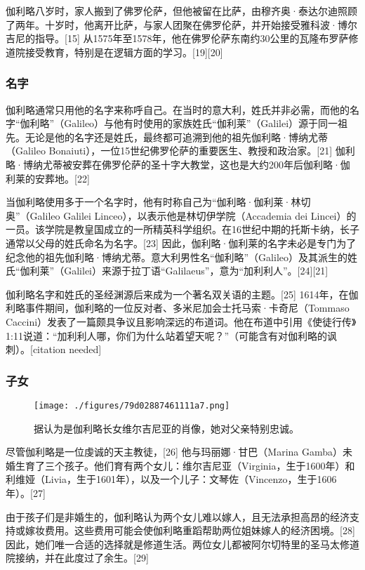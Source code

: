伽利略八岁时，家人搬到了佛罗伦萨，但他被留在比萨，由穆齐奥·泰达尔迪照顾了两年。十岁时，他离开比萨，与家人团聚在佛罗伦萨，并开始接受雅科波·博尔吉尼的指导。[15] 从1575年至1578年，他在佛罗伦萨东南约30公里的瓦隆布罗萨修道院接受教育，特别是在逻辑方面的学习。[19][20]
\subsubsection{名字}  
伽利略通常只用他的名字来称呼自己。在当时的意大利，姓氏并非必需，而他的名字“伽利略”（Galileo）与他有时使用的家族姓氏“伽利莱”（Galilei）源于同一祖先。无论是他的名字还是姓氏，最终都可追溯到他的祖先伽利略·博纳尤蒂（Galileo Bonaiuti），一位15世纪佛罗伦萨的重要医生、教授和政治家。[21] 伽利略·博纳尤蒂被安葬在佛罗伦萨的圣十字大教堂，这也是大约200年后伽利略·伽利莱的安葬地。[22]  

当伽利略使用多于一个名字时，他有时称自己为“伽利略·伽利莱·林切奥”（Galileo Galilei Linceo），以表示他是林切伊学院（Accademia dei Lincei）的一员。该学院是教皇国成立的一所精英科学组织。在16世纪中期的托斯卡纳，长子通常以父母的姓氏命名为名字。[23] 因此，伽利略·伽利莱的名字未必是专门为了纪念他的祖先伽利略·博纳尤蒂。意大利男性名“伽利略”（Galileo）及其派生的姓氏“伽利莱”（Galilei）来源于拉丁语“Galilaeus”，意为“加利利人”。[24][21]  

伽利略名字和姓氏的圣经渊源后来成为一个著名双关语的主题。[25] 1614年，在伽利略事件期间，伽利略的一位反对者、多米尼加会士托马索·卡奇尼（Tommaso Caccini）发表了一篇颇具争议且影响深远的布道词。他在布道中引用《使徒行传》1:11说道：“加利利人哪，你们为什么站着望天呢？”（可能含有对伽利略的讽刺）。[citation needed]  
\subsubsection{子女}  
\begin{figure}[ht]
\centering
\texttt{[image: ./figures/79d02887461111a7.png]}
\caption{据认为是伽利略长女维尔吉尼亚的肖像，她对父亲特别忠诚。} \label{fig_JLL_2}
\end{figure}
尽管伽利略是一位虔诚的天主教徒，[26] 他与玛丽娜·甘巴（Marina Gamba）未婚生育了三个孩子。他们育有两个女儿：维尔吉尼亚（Virginia，生于1600年）和利维娅（Livia，生于1601年），以及一个儿子：文琴佐（Vincenzo，生于1606年）。[27]  

由于孩子们是非婚生的，伽利略认为两个女儿难以嫁人，且无法承担高昂的经济支持或嫁妆费用。这些费用可能会使伽利略重蹈帮助两位姐妹嫁人的经济困境。[28] 因此，她们唯一合适的选择就是修道生活。两位女儿都被阿尔切特里的圣马太修道院接纳，并在此度过了余生。[29]  

